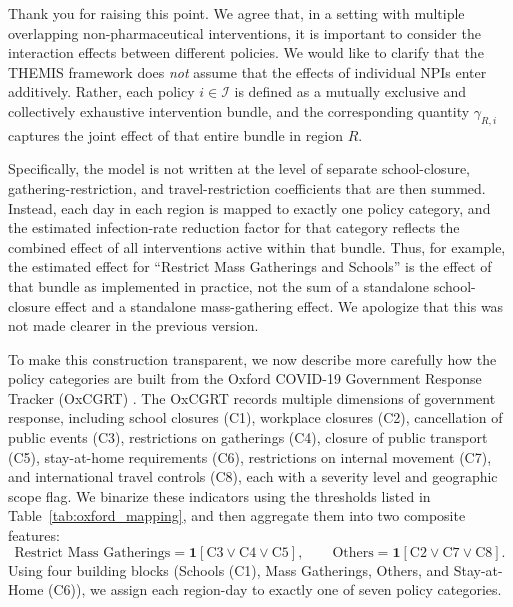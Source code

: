 \documentclass[letterpaper,twoside,11pt]{reviewresponse}
\begin{document}
Thank you for raising this point. We agree that, in a setting with multiple overlapping non-pharmaceutical interventions, it is important to consider the interaction effects between different policies. We would like to clarify that the THEMIS framework does \emph{not} assume that the effects of individual NPIs enter additively. Rather, each policy $i \in \mathcal{I}$ is defined as a mutually exclusive and collectively exhaustive intervention bundle, and the corresponding quantity $\gamma_{R,i}$ captures the joint effect of that entire bundle in region $R$.

Specifically, the model is not written at the level of separate school-closure, gathering-restriction, and travel-restriction coefficients that are then summed. Instead, each day in each region is mapped to exactly one policy category, and the estimated infection-rate reduction factor for that category reflects the combined effect of all interventions active within that bundle. Thus, for example, the estimated effect for ``Restrict Mass Gatherings and Schools'' is the effect of that bundle as implemented in practice, not the sum of a standalone school-closure effect and a standalone mass-gathering effect. We apologize that this was not made clearer in the previous version.

To make this construction transparent, we now describe more carefully how the policy categories are built from the Oxford COVID-19 Government Response Tracker (OxCGRT) \cite{hale2021global}. The OxCGRT records multiple dimensions of government response, including school closures (C1), workplace closures (C2), cancellation of public events (C3), restrictions on gatherings (C4), closure of public transport (C5), stay-at-home requirements (C6), restrictions on internal movement (C7), and international travel controls (C8), each with a severity level and geographic scope flag. We binarize these indicators using the thresholds listed in Table~\ref{tab:oxford_mapping}, and then aggregate them into two composite features:
\[
\text{Restrict Mass Gatherings} = \mathbf{1}[\text{C3} \lor \text{C4} \lor \text{C5}],
\qquad
\text{Others} = \mathbf{1}[\text{C2} \lor \text{C7} \lor \text{C8}].
\]
Using four building blocks (Schools (C1), Mass Gatherings, Others, and Stay-at-Home (C6)), we assign each region-day to exactly one of seven policy categories.
\end{document}
